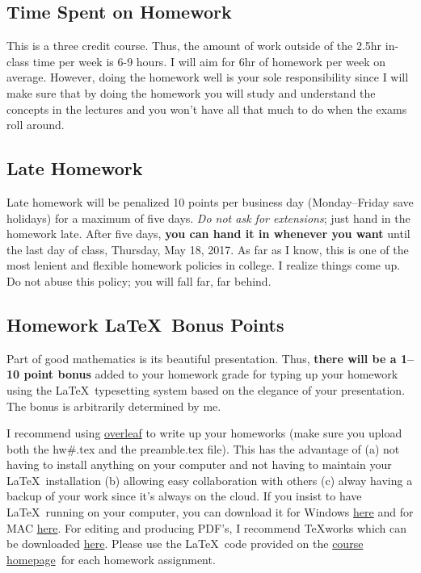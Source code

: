 \documentclass[12pt]{article}
\newcommand{\ingreen}[1]{\color{green}\textbf{#1} \color{black}}
\newcommand{\coursewebpage}{\href{https://github.com/kapelner/QC_Math_341_Spring_2017}{course homepage}}
\begin{document}
\subsection*{Time Spent on Homework }

This is a three credit course. Thus, the amount of work outside of the 2.5hr in-class time per week is 6-9 hours. I will aim for 6hr of homework per week on average. However, doing the homework well is your sole responsibility since I will make sure that by doing the homework you will study and understand the concepts in the lectures and you won't have all that much to do when the exams roll around.

\subsection*{Late Homework}

Late homework will be penalized 10 points per business day (Monday--Friday save holidays) for a maximum of five days. \textit{Do not ask for extensions}; just hand in the homework late. After five days, \textbf{you can hand it in whenever you want} until the last day of class, Thursday, May 18, 2017. As far as I know, this is one of the most lenient and flexible homework policies in college. I realize things come up. Do not abuse this policy; you will fall far, far behind.

\subsection*{Homework \LaTeX~Bonus Points}

Part of good mathematics is its beautiful presentation. Thus, \ingreen{there will be a 1--10 point bonus} added to your homework grade  for typing up your homework using the \LaTeX ~typesetting system based on the elegance of your presentation. The bonus is arbitrarily determined by me.

I recommend using \href{http://overleaf.com}{overleaf} to write up your homeworks (make sure you upload both the hw\#.tex and the preamble.tex file). This has the advantage of (a) not having to install anything on your computer and not having to maintain your \LaTeX ~installation (b) allowing easy collaboration with others (c) alway having a backup of your work since it's always on the cloud. If you insist to have \LaTeX ~running on your computer, you can download it for Windows \href{http://www.miktex.org/download}{here} and for MAC \href{http://www.tug.org/mactex/}{here}. For editing and producing PDF's, I recommend \TeX works which can be downloaded \href{http://www.tug.org/texworks/#Getting_TeXworks}{here}. Please use the \LaTeX ~code provided on the \coursewebpage ~for each homework assignment. 
\end{document}
